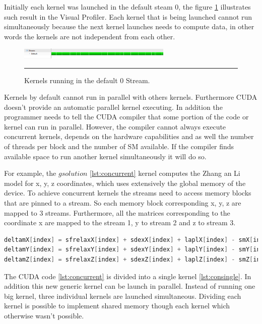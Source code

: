 Initially each kernel was launched in the default steam 0, the figure \ref{fig:streams} illustrates such result in the Visual Profiler. Each kernel that is being launched cannot run simultaneously because the next kernel launches needs to compute data, in other words the kernels are not independent from each other.

\begin{figure}[htbp]
	\centering
		\includegraphics[width=0.65\textwidth]{Figures/ini_steams.png}
		\rule{35em}{0.2pt}
	\caption[Initial Streams]{Kernels running in the default 0 Stream.
}
	\label{fig:streams}
\end{figure}

 Kernels by default cannot run in parallel with others kernels. Furthermore CUDA doesn't provide an automatic parallel kernel executing. In addition the programmer needs to tell the CUDA compiler that some portion of the code or kernel can run in parallel. However, the compiler cannot always execute concurrent kernels, depends on the hardware capabilities and as well the number of threads per block and the number of SM available. If the compiler finds available space to run another kernel simultaneously it will do so. 

For example, the $gsolution$ \ref{lst:concurrent} kernel computes the Zhang an Li model for x, y, z coordinates, which uses extensively the global memory of the device. To achieve concurrent kernels the streams need to access memory blocks that are pinned to a stream. So each memory block corresponding x, y, z are mapped to 3 streams. Furthermore, all the matrices corresponding to the coordinate x are mapped to the stream 1, y to stream 2 and z to stream 3.

\begin{lstlisting}[language=C++, label={lst:concurrent}, caption={Evaluation of x, y, z coordinates of the Zhang and Li model in a single kernel}]
deltamX[index] = sfrelaxX[index] + sdexX[index] + laplX[index] - smX[index];
deltamY[index] = sfrelaxY[index] + sdexY[index] + laplY[index] - smY[index];
deltamZ[index] = sfrelaxZ[index] + sdexZ[index] + laplZ[index] - smZ[index];
\end{lstlisting}
 
The CUDA code \ref{lst:concurrent} is divided into a single kernel \ref{lst:consingle}. In addition this new generic kernel can be launch in parallel. Instead of running one big kernel, three individual kernels are launched simultaneous. Dividing each kernel is possible to implement shared memory though each kernel which otherwise wasn't possible. 

